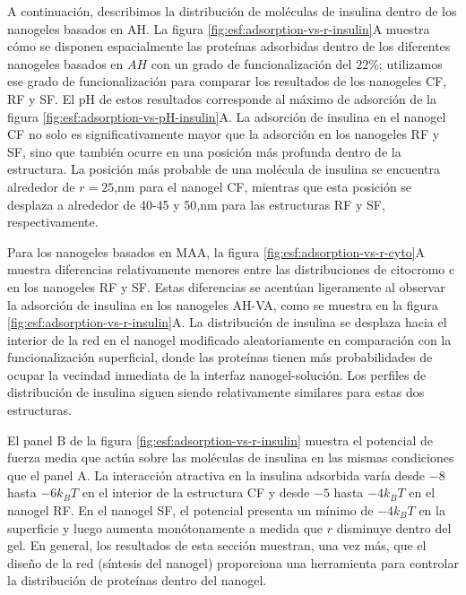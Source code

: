 A continuaci\'on, describimos la distribuci\'on de mol\'eculas de insulina dentro de los nanogeles basados en AH.
La figura \ref{fig:esf:adsorption-vs-r-insulin}A muestra c\'omo se disponen espacialmente las prote\'inas adsorbidas dentro de los diferentes nanogeles basados en $AH$ con un grado de funcionalizaci\'on del $22\%$;
utilizamos ese grado de funcionalizaci\'on para comparar los resultados de los nanogeles CF, RF y SF.
El pH de estos resultados corresponde al m\'aximo de adsorci\'on de la figura \ref{fig:esf:adsorption-vs-pH-insulin}A.
La adsorci\'on de insulina en el nanogel CF no solo es significativamente mayor que la adsorci\'on en los nanogeles RF y SF, sino que tambi\'en ocurre en una posici\'on m\'as profunda dentro de la estructura.
La posici\'on m\'as probable de una mol\'ecula de insulina se encuentra alrededor de $r=25$,nm para el nanogel CF,
mientras que esta posici\'on se desplaza a alrededor de 40-45 y 50,nm para las estructuras RF y SF, respectivamente.

Para los nanogeles basados en MAA, la figura \ref{fig:esf:adsorption-vs-r-cyto}A muestra diferencias relativamente menores entre las distribuciones de citocromo c en los nanogeles RF y SF.
Estas diferencias se acent\'uan ligeramente al observar la adsorci\'on de insulina en los nanogeles AH-VA, como se muestra en la figura \ref{fig:esf:adsorption-vs-r-insulin}A.
La distribuci\'on de insulina se desplaza hacia el interior de la red en el nanogel modificado aleatoriamente en comparaci\'on con la funcionalizaci\'on superficial, donde las prote\'inas tienen m\'as probabilidades de ocupar la vecindad inmediata de la interfaz nanogel-soluci\'on.
Los perfiles de distribuci\'on de insulina siguen siendo relativamente similares para estas dos estructuras.

El panel B de la figura \ref{fig:esf:adsorption-vs-r-insulin} muestra el potencial de fuerza media que act\'ua sobre las mol\'eculas de insulina en las mismas condiciones que el panel A.
La interacci\'on atractiva en la insulina adsorbida var\'ia desde $-8$ hasta $-6 k_B T$ en el interior de la estructura CF y desde $-5$ hasta $-4 k_B T$ en el nanogel RF.
En el nanogel SF, el potencial presenta un m\'inimo de $-4 k_B T$ en la superficie y luego aumenta mon\'otonamente a medida que $r$ disminuye dentro del gel.
En general, los resultados de esta secci\'on muestran, una vez m\'as, que el dise\~no de la red (s\'intesis del nanogel) proporciona una herramienta para controlar la distribuci\'on de prote\'inas dentro del nanogel.






